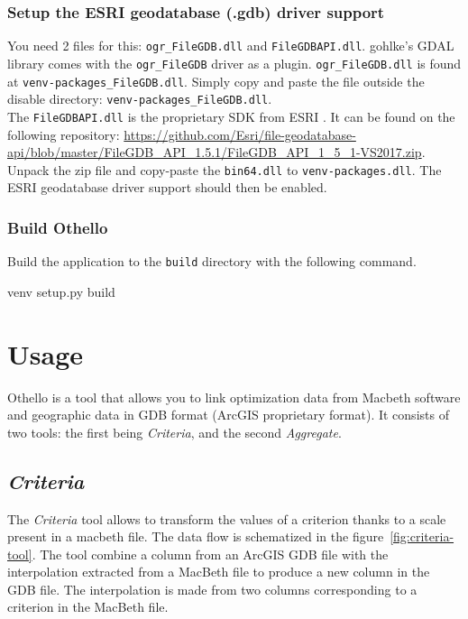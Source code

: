 \documentclass[11pt]{article}
\begin{document}
\subsubsection{Setup the ESRI geodatabase (.gdb) driver support}
\noindent You need 2 files for this: \texttt{ogr\_FileGDB.dll} and \texttt{FileGDBAPI.dll}.
gohlke's GDAL library comes with the \texttt{ogr\_FileGDB} driver as a plugin.
\texttt{ogr\_FileGDB.dll} is found at \texttt{venv\Lib\site-packages\osgeo\gdalplugins\disable\ogr\_FileGDB.dll}.
Simply copy and paste the file outside the disable directory: \texttt{venv\Lib\site-packages\osgeo\gdalplugins\ogr\_FileGDB.dll}. \\


\noindent The \texttt{FileGDBAPI.dll} is the proprietary SDK from ESRI .
It can be found on the following repository: \url{https://github.com/Esri/file-geodatabase-api/blob/master/FileGDB_API_1.5.1/FileGDB_API_1_5_1-VS2017.zip}.
Unpack the zip file and copy-paste the \texttt{bin64\FileGDPAPI.dll} to \texttt{venv\Lib\site-packages\osgeo\FileGDPAPI.dll}.
The ESRI geodatabase driver support should then be enabled.

\subsubsection{Build Othello}
\noindent Build the application to the \texttt{build} directory with the following command.
\begin{code}
venv\Scripts{} setup.py build
\end{code}


\newpage
\section{Usage}\label{sec:usage}
Othello is a tool that allows you to link optimization data from Macbeth software
and geographic data in GDB format (ArcGIS proprietary format).
It consists of two tools: the first being \textit{Criteria}, and the second \textit{Aggregate}.

\subsection{\textit{Criteria}}\label{subsec:criteria}
The \textit{Criteria} tool allows to transform the values of a criterion thanks
to a scale present in a macbeth file.
The data flow is schematized in the figure\ \ref{fig:criteria-tool}.
The tool combine a column from an ArcGIS GDB file
with the interpolation extracted from a MacBeth file to produce
a new column in the GDB file.
The interpolation is made from two columns corresponding to a criterion in the MacBeth file.
\end{document}
